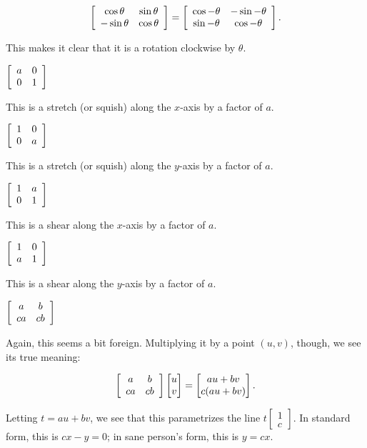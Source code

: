 \documentclass[../key.tex]{subfiles}
\begin{document}
$$\left[\begin{array}{cc} \cos\theta & \sin\theta \\ -\sin\theta & \cos\theta \end{array}\right]= \left[\begin{array}{cc} \cos-\theta & -\sin-\theta \\ \sin-\theta & \cos-\theta \end{array}\right].$$

This makes it clear that it is a rotation clockwise by $\theta$.

\begin{inner_problem}
\item $\left[\begin{array}{cc} a & 0 \\ 0 & 1 \end{array}\right]$
\end{inner_problem}

This is a stretch (or squish) along the $x$-axis by a factor of $a$.

\begin{inner_problem}
\item $\left[\begin{array}{cc} 1 & 0 \\ 0 & a \end{array}\right]$
\end{inner_problem}

This is a stretch (or squish) along the $y$-axis by a factor of $a$.

\begin{inner_problem}
\item $\left[\begin{array}{cc} 1 & a \\ 0 & 1 \end{array}\right]$
\end{inner_problem}

This is a shear along the $x$-axis by a factor of $a$.

\begin{inner_problem}
\item $\left[\begin{array}{cc} 1 & 0 \\ a & 1 \end{array}\right]$
\end{inner_problem}

This is a shear along the $y$-axis by a factor of $a$.

\begin{inner_problem}
\item $\left[\begin{array}{cc} a & b \\ ca & cb \end{array}\right]$
\end{inner_problem}

Again, this seems a bit foreign. Multiplying it by a point $(u,v)$, though, we see its true meaning:

$$\left[\begin{array}{cc} a & b \\ ca & cb \end{array}\right]\begin{bmatrix} u \\ v \end{bmatrix} = \begin{bmatrix} au+bv \\ c(au+bv) \end{bmatrix}.$$

Letting $t=au+bv$, we see that this parametrizes the line $t\begin{bmatrix}1 \\ c \end{bmatrix}$. In standard form, this is $cx-y=0$; in sane person's form, this is $y = cx$.
\end{document}
